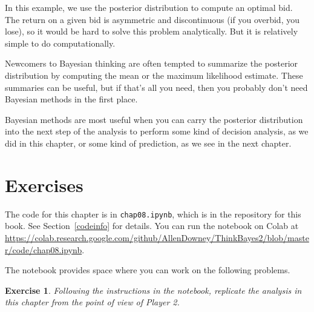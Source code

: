 \documentclass[12pt]{book}
\theoremstyle{exercise}
\newtheorem{exercise}{Exercise}[chapter]
\newcommand{\py}[1]{{\tt #1}}%
\begin{document}
In this example, we use the posterior distribution
to compute an optimal bid.  The return on a given bid is asymmetric
and discontinuous (if you overbid, you lose), so it would be hard to
solve this problem analytically.  But it is relatively simple to do
computationally.

Newcomers to Bayesian thinking are often tempted to summarize the
posterior distribution by computing the mean or the maximum
likelihood estimate.  These summaries can be useful, but if that's
all you need, then you probably don't need Bayesian methods in the
first place.

Bayesian methods are most useful when you can carry the posterior
distribution into the next step of the analysis to perform some
kind of decision analysis, as we did in this chapter, or some kind of
prediction, as we see in the next chapter.

\section{Exercises}

The code for this chapter is in \py{chap08.ipynb}, which is in the repository for this book.  See Section~\ref{codeinfo} for details.
You can run the notebook on Colab at \url{https://colab.research.google.com/github/AllenDowney/ThinkBayes2/blob/master/code/chap08.ipynb}.

The notebook provides space where you can work on the following problems.

\begin{exercise}
Following the instructions in the notebook, replicate the analysis in this chapter from the point of view of Player 2.
\end{exercise}
\end{document}
